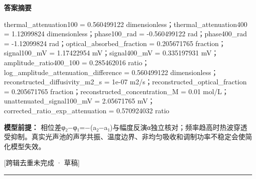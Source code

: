 \documentclass[UTF8,11pt,a4paper]{ctexart}
\begin{document}
\noindent\textbf{答案摘要}\par
thermal\_attenuation100 = 0.560499122 dimensionless；thermal\_attenuation400 = 1.12099824 dimensionless；phase100\_rad = -0.560499122 rad；phase400\_rad = -1.12099824 rad；optical\_absorbed\_fraction = 0.205671765 fraction；signal100\_mV = 1.17422954 mV；signal400\_mV = 0.335197931 mV；amplitude\_ratio400\_100 = 0.285462016 ratio；log\_amplitude\_attenuation\_difference = 0.560499122 dimensionless；reconstructed\_diffusivity\_m2\_s = 1e-07 m2/s；reconstructed\_optical\_fraction = 0.205671765 fraction；reconstructed\_concentration\_M = 0.01 mol/L；unattenuated\_signal100\_mV = 2.05671765 mV；corrected\_ratio\_exp\_attenuation = 0.570924032 ratio\par
\noindent\textbf{模型前提：}
相位差φ₂−φ₁=−(a₂−a₁)与幅度反演α独立核对；频率趋高时热波穿透受抑制。真实光声池的声学共振、温度边界、非均匀吸收和调制功率不稳定会使简化模型失效。\par
\noindent\textcolor{red!65!black}{[跨辑去重未完成 · 草稿]} \par
\medskip\hrule\medskip
{}
\end{document}
